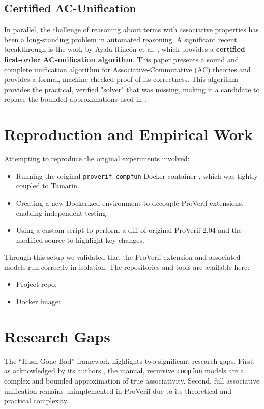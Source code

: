 \documentclass[journal]{IEEEtran}
\begin{document}
\subsection{Certified AC-Unification}
In parallel, the challenge of reasoning about terms with associative properties has been a long-standing problem in automated reasoning. A significant recent breakthrough is the work by Ayala-Rincón et al. \cite{ayala2024certified}, which provides a \textbf{certified first-order AC-unification algorithm}. This paper presents a sound and complete unification algorithm for Associative-Commutative (AC) theories and provides a formal, machine-checked proof of its correctness. This algorithm provides the practical, verified "solver" that was missing, making it a candidate to replace the bounded approximations used in \cite{cheval2023hash}.

\section{Reproduction and Empirical Work}
Attempting to reproduce the original experiments \cite{cheval2023hash} involved:
\begin{itemize}
    \item Running the original \texttt{proverif-compfun} Docker container \cite{orig_repo}, which was tightly coupled to Tamarin.
    \item Creating a new Dockerized environment to decouple ProVerif extensions, enabling independent testing.
    \item Using a custom script to perform a diff of original ProVerif 2.04 and the modified source to highlight key changes.
\end{itemize}
Through this setup we validated that the ProVerif extension and associated models run correctly in isolation. The repositories and tools are available here:
\begin{itemize}
    \item Project repo: \cite{our_repo}
    \item Docker image: \cite{our_docker}
\end{itemize}

\section{Research Gaps}
\label{sec:gaps}

The ``Hash Gone Bad'' framework \cite{cheval2023hash} highlights two significant research gaps. First, as acknowledged by its authors \cite{cheval2023hash}, the manual, recursive \texttt{compfun} models are a complex and bounded approximation of true associativity. Second, full associative unification remains unimplemented in ProVerif due to its theoretical and practical complexity.
\end{document}
